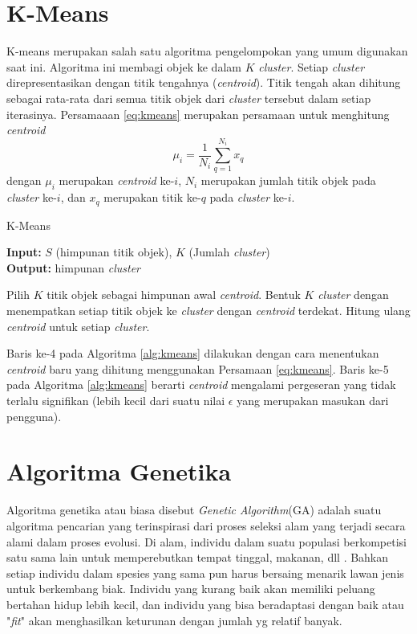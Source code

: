 \section{K-Means}
K-means merupakan salah satu algoritma pengelompokan yang umum digunakan saat ini. Algoritma ini membagi objek ke dalam $K$ \textit{cluster}. Setiap \textit{cluster} direpresentasikan dengan titik tengahnya (\textit{centroid}). Titik tengah akan dihitung sebagai rata-rata dari semua titik objek dari \textit{cluster} tersebut dalam setiap iterasinya. Persamaaan \ref{eq:kmeans} merupakan persamaan untuk menghitung \textit{centroid}
\begin{equation}
	\label{eq:kmeans}
	\mu_i=\frac{1}{N_i}\sum_{q=1}^{N_i}x_q
\end{equation}
dengan $\mu_i$ merupakan \textit{centroid} ke-$i$, $N_i$ merupakan jumlah titik objek pada \textit{cluster} ke-$i$, dan $x_q$ merupakan titik ke-$q$ pada \textit{cluster} ke-$i$.

\begin{algorithm} %
\caption{K-Means} %
\label{alg:kmeans} %
\begin{flushleft}
	\textbf{Input:} $S$ (himpunan titik objek), $K$ (Jumlah \textit{cluster})\\
	\textbf{Output:} himpunan \textit{cluster}
\end{flushleft}
\begin{algorithmic}[1] %
	\STATE Pilih $K$ titik objek sebagai himpunan awal \textit{centroid}.
	\REPEAT 
		\STATE Bentuk $K$ \textit{cluster} dengan menempatkan setiap titik objek ke \textit{cluster} dengan \textit{centroid} terdekat.
		\STATE Hitung ulang \textit{centroid} untuk setiap \textit{cluster}. 
\end{algorithmic}
\end{algorithm}

Baris ke-4 pada Algoritma \ref{alg:kmeans} dilakukan dengan cara menentukan \textit{centroid} baru yang dihitung menggunakan Persamaan \ref{eq:kmeans}. Baris ke-5 pada Algoritma \ref{alg:kmeans} berarti \textit{centroid} mengalami pergeseran yang tidak terlalu signifikan (lebih kecil dari suatu nilai $\epsilon$ yang merupakan masukan dari pengguna).

\section{Algoritma Genetika}
Algoritma genetika atau biasa disebut \textit{Genetic Algorithm}(GA) adalah suatu algoritma pencarian yang terinspirasi dari proses seleksi alam yang terjadi secara alami dalam proses evolusi. Di alam, individu dalam suatu populasi berkompetisi satu sama lain untuk memperebutkan tempat tinggal, makanan, dll \cite{sivanandam2007introduction}. Bahkan setiap individu dalam spesies yang sama pun harus bersaing menarik lawan jenis untuk berkembang biak. Individu yang kurang baik akan memiliki peluang bertahan hidup lebih kecil, dan individu yang bisa beradaptasi dengan baik atau "\textit{fit}" akan menghasilkan keturunan dengan jumlah yg relatif banyak. 

